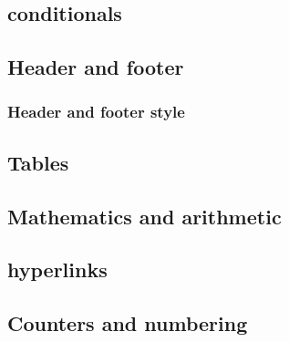     \subsection*{\thesubsection\hspace{1em}\Glspl{conditional}}
    \label{sec:tutorial/preamble/conditional}
    
    
    \subsection{Header and footer}
    \label{sec:tutorial/preamble/headfoot}
    
    
        \subsubsection{Header and footer style}
        \label{sec:tutorial/preamble/headfoot/style}
        
    
    \subsection{Tables}
    \label{sec:tutorial/preamble/table}
    
    
    \subsection{Mathematics and arithmetic}
    \label{sec:tutorial/preamble/math}
    
    
    \subsection*{\thesubsection\hspace{1em}\Glspl{hyperlink}}
    \label{sec:tutorial/preamble/ref}
    
    
    \subsection{Counters and numbering}
    \label{sec:tutorial/preamble/count}
    
    
